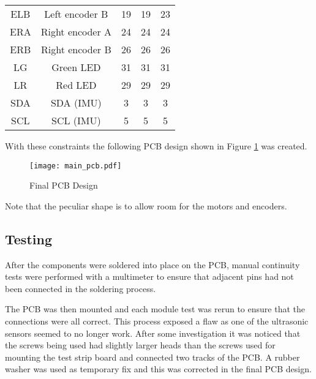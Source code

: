 \begin{table}[!ht]
\begin{tabular}{ccccc}
        ELB & Left encoder B         & 19 & 19 & 23 \\
        ERA & Right encoder A        & 24 & 24 & 24 \\
        ERB & Right encoder B        & 26 & 26 & 26 \\
        LG  & Green LED              & 31 & 31 & 31 \\
        LR  & Red LED                & 29 & 29 & 29 \\
        SDA & \isc{} SDA (IMU)       & 3  & 3  & 3  \\
        SCL & \isc{} SCL (IMU)       & 5  & 5  & 5  \\
        \bottomrule
    \end{tabular}
\end{table}

With these constraints the following PCB design shown in Figure \ref{PCB_Design} was created.

\begin{figure}[!ht]
	\centering
	\texttt{[image: main\_pcb.pdf]}
	\caption{Final PCB Design}\label{PCB_Design}

\end{figure}
Note that the peculiar shape is to allow room for the motors and encoders.

\subsection{Testing}\label{elec/pcb/test}
After the components were soldered into place on the PCB, manual
continuity tests were performed with a multimeter to ensure that adjacent
pins had not been connected in the soldering process.

The PCB was then mounted and each module test was rerun to ensure that the
connections were all correct. This process exposed a flaw as one of the
ultrasonic sensors seemed to no longer work. After some investigation it
was noticed that the screws being used had slightly larger heads than the
screws used for mounting the test strip board and connected two
tracks of the PCB. A rubber washer was used as temporary fix and this was
corrected in the final PCB design.
